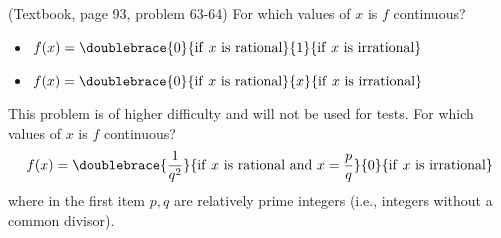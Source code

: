 \begin{problem}(Textbook, page 93, problem 63-64) 
For which values of $x$ is $f$ continuous?
\begin{itemize}
\item $f(x)=\doublebrace{0}{\mathrm{if~} x\mathrm{~is~rational}}{1}{\mathrm{if~}x~\mathrm{is~irrational}}$
\item $f(x)=\doublebrace{0}{\mathrm{if~} x\mathrm{~is~rational}}{x}{\mathrm{if~}x~\mathrm{is~irrational}}$
\end{itemize}
\end{problem}
\begin{problem} This problem is of higher difficulty and will not be used for tests. For which values of $x$ is $f$ continuous?
\[f(x)=\doublebrace{\frac{1}{q^2}}{\mathrm{if~}x\mathrm{~is~rational~and~} x=\frac{p}{q} }{0}{\mathrm{if~}x~\mathrm{is~irrational}}\]
where in the first item $p,q$ are relatively prime integers (i.e., integers without a common divisor).
\end{problem}